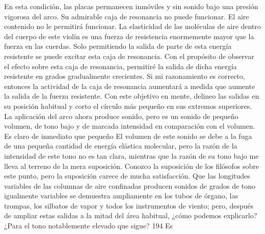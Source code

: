 En esta condición, las placas permanecen inmóviles y sin sonido bajo una presión vigorosa del arco. Su admirable caja de resonancia no puede funcionar. El aire contenido no le permitirá funcionar. La elasticidad de las moléculas de aire dentro del cuerpo de este violín es una fuerza de resistencia enormemente
mayor que la fuerza en las cuerdas. Solo permitiendo la salida de parte de esta energía resistente se puede excitar esta caja de resonancia. Con el propósito de observar el efecto sobre esta caja de resonancia, permitiré la salida de dicha energía resistente en grados gradualmente crecientes. Si mi razonamiento es correcto, entonces la actividad de la caja de resonancia aumentará a medida que aumente la salida de la fuerza resistente. Con este objetivo en mente, delineo las salidas en su posición habitual y corto el círculo más pequeño en sus extremos superiores. La aplicación del arco ahora produce sonido, pero es un sonido de pequeño volumen, de tono bajo y de marcada intensidad en comparación con el volumen. Es claro de inmediato que pequeño
El volumen de este sonido se debe a la fuga de una pequeña cantidad de energía elástica molecular, pero la razón de la intensidad de este tono no es tan clara, mientras que la razón de su tono bajo me lleva al terreno de la mera suposición. Conozco la suposición de los filósofos sobre este punto, pero la suposición carece de mucha satisfacción. Que las longitudes variables de las columnas de aire confinadas producen sonidos de grados de tono igualmente variables se demuestra ampliamente en los tubos de órgano, las trompas, los silbatos de vapor y todos los instrumentos de viento; pero, después de ampliar estas salidas a la mitad del área habitual, ¿cómo podemos explicarlo?
¿Para el tono notablemente elevado que sigue? 194	Es

